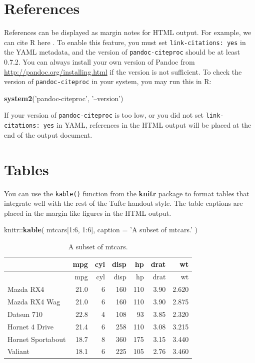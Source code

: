 \documentclass[]{tufte-handout}
\newenvironment{Shaded}{}{}
\newcommand{\KeywordTok}[1]{\textcolor[rgb]{0.00,0.44,0.13}{\textbf{#1}}}
\newcommand{\DataTypeTok}[1]{\textcolor[rgb]{0.56,0.13,0.00}{#1}}
\newcommand{\DecValTok}[1]{\textcolor[rgb]{0.25,0.63,0.44}{#1}}
\newcommand{\StringTok}[1]{\textcolor[rgb]{0.25,0.44,0.63}{#1}}
\newcommand{\OperatorTok}[1]{\textcolor[rgb]{0.40,0.40,0.40}{#1}}
\newcommand{\NormalTok}[1]{#1}
\begin{document}
\section{References}\label{references}

References can be displayed as margin notes for HTML output. For
example, we can cite R here \citep{R-base}. To enable this feature, you
must set \texttt{link-citations:\ yes} in the YAML metadata, and the
version of \texttt{pandoc-citeproc} should be at least 0.7.2. You can
always install your own version of Pandoc from
\url{http://pandoc.org/installing.html} if the version is not
sufficient. To check the version of \texttt{pandoc-citeproc} in your
system, you may run this in R:

\begin{Shaded}
\begin{Highlighting}[]
\KeywordTok{system2}\NormalTok{(}\StringTok{'pandoc-citeproc'}\NormalTok{, }\StringTok{'--version'}\NormalTok{)}
\end{Highlighting}
\end{Shaded}

If your version of \texttt{pandoc-citeproc} is too low, or you did not
set \texttt{link-citations:\ yes} in YAML, references in the HTML output
will be placed at the end of the output document.

\section{Tables}\label{tables}

You can use the \texttt{kable()} function from the \textbf{knitr}
package to format tables that integrate well with the rest of the Tufte
handout style. The table captions are placed in the margin like figures
in the HTML output.

\begin{Shaded}
\begin{Highlighting}[]
\NormalTok{knitr}\OperatorTok{::}\KeywordTok{kable}\NormalTok{(}
\NormalTok{  mtcars[}\DecValTok{1}\OperatorTok{:}\DecValTok{6}\NormalTok{, }\DecValTok{1}\OperatorTok{:}\DecValTok{6}\NormalTok{], }\DataTypeTok{caption =} \StringTok{'A subset of mtcars.'}
\NormalTok{)}
\end{Highlighting}
\end{Shaded}

\begin{longtable}[]{@{}lrrrrrr@{}}
\caption{A subset of mtcars.}\tabularnewline
\toprule
& mpg & cyl & disp & hp & drat & wt\tabularnewline
\midrule
\endfirsthead
\toprule
& mpg & cyl & disp & hp & drat & wt\tabularnewline
\midrule
\endhead
Mazda RX4 & 21.0 & 6 & 160 & 110 & 3.90 & 2.620\tabularnewline
Mazda RX4 Wag & 21.0 & 6 & 160 & 110 & 3.90 & 2.875\tabularnewline
Datsun 710 & 22.8 & 4 & 108 & 93 & 3.85 & 2.320\tabularnewline
Hornet 4 Drive & 21.4 & 6 & 258 & 110 & 3.08 & 3.215\tabularnewline
Hornet Sportabout & 18.7 & 8 & 360 & 175 & 3.15 & 3.440\tabularnewline
Valiant & 18.1 & 6 & 225 & 105 & 2.76 & 3.460\tabularnewline
\bottomrule
\end{longtable}
\end{document}
